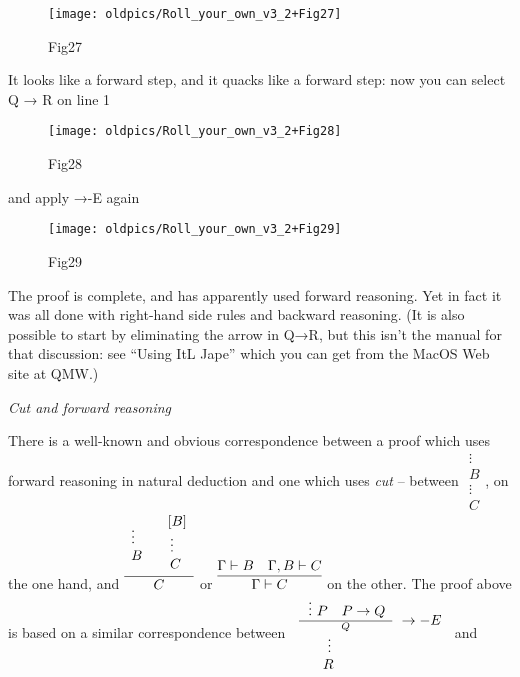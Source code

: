 \documentclass[11pt]{book}
\newcommand {\cols}[1][*{50}{l}]{\begin{array}{#1}}
\newcommand {\sloc}{\end{array}}
\begin{document}
\begin{figure}[htbp] \begin{center} \texttt{[image: oldpics/Roll\_your\_own\_v3\_2+Fig27]} \caption{Fig27} \end{center} \end{figure}


It looks like a forward step, and it quacks like a forward step: now you can select Q → R on line 1

\begin{figure}[htbp] \begin{center} \texttt{[image: oldpics/Roll\_your\_own\_v3\_2+Fig28]} \caption{Fig28} \end{center} \end{figure}


and apply →-E again

\begin{figure}[htbp] \begin{center} \texttt{[image: oldpics/Roll\_your\_own\_v3\_2+Fig29]} \caption{Fig29} \end{center} \end{figure}


The proof is complete, and has apparently used forward reasoning. Yet in fact it was all done with right-hand side rules and backward reasoning. (It is also possible to start by eliminating the arrow in Q→R, but this isn't the manual for that discussion: see ``Using ItL Jape'' which you can get from the MacOS Web site at QMW.)


\textit{Cut and forward reasoning}


There is a well-known and obvious correspondence between a proof which uses forward reasoning in natural deduction and one which uses \textit{cut} -- between
$ \begin{array}{l} \vdots  \\
B \\
\vdots  \\
C \end{array} $, on the one hand, and $\infer{C}{\cols\vdots\\B\sloc & \cols \![B]\\ \vdots\\ C\sloc}$ or $\infer{\Gamma  |- C}
       {\Gamma  |- B\quad \Gamma,B |- C}$ on the other. The proof above is based on a similar correspondence between $ \begin{array}{l} \frac{ \begin{array}{l} \thinspace \vdots  \ P\quad P->Q \end{array} }{Q} \;->-E \\
\quad \quad \,\vdots  \\
\quad \;\;\;R \end{array} $ and
\end{document}
